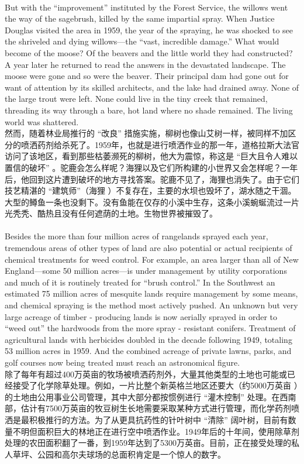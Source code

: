 \documentclass{article}
\begin{document}
\\
But with the “improvement” instituted by the Forest Service, the willows went the way of the sagebrush, killed by the same impartial spray. When Justice Douglas visited the area in 1959, the year of the spraying, he was shocked to see the shriveled and dying willows—the “vast, incredible damage.” What would become of the moose? Of the beavers and the little world they had constructed? A year later he returned to read the answers in the devastated landscape. The moose were gone and so were the beaver. Their principal dam had gone out for want of attention by its skilled architects, and the lake had drained away. None of the large trout were left. None could live in the tiny creek that remained, threading its way through a bare, hot land where no shade remained. The living world was shattered.\\
然而，随着林业局推行的 “改良” 措施实施，柳树也像山艾树一样，被同样不加区分的喷洒药剂给杀死了。1959年，也就是进行喷洒作业的那一年，道格拉斯大法官访问了该地区，看到那些枯萎濒死的柳树，他大为震惊，称这是 “巨大且令人难以置信的破坏” 。驼鹿会怎么样呢？海狸以及它们所构建的小世界又会怎样呢？一年后，他回到这片遭到破坏的地方寻找答案。驼鹿不见了，海狸也消失了。由于它们技艺精湛的 “建筑师”（海狸 ）不复存在，主要的水坝也毁坏了，湖水随之干涸。大型的鳟鱼一条也没剩下。没有鱼能在仅存的小溪中生存，这条小溪蜿蜒流过一片光秃秃、酷热且没有任何遮荫的土地。生物世界被摧毁了。\\

\\
Besides the more than four million acres of rangelands sprayed each year, tremendous areas of other types of land are also potential or actual recipients of chemical treatments for weed control. For example, an area larger than all of New England—some 50 million acres—is under management by utility corporations and much of it is routinely treated for “brush control.” In the Southwest an estimated 75 million acres of mesquite lands require management by some means, and chemical spraying is the method most actively pushed. An unknown but very large acreage of timber - producing lands is now aerially sprayed in order to “weed out” the hardwoods from the more spray - resistant conifers. Treatment of agricultural lands with herbicides doubled in the decade following 1949, totaling 53 million acres in 1959. And the combined acreage of private lawns, parks, and golf courses now being treated must reach an astronomical figure.\\
除了每年有超过400万英亩的牧场被喷洒药剂外，大量其他类型的土地也可能或已经接受了化学除草处理。例如，一片比整个新英格兰地区还要大（约5000万英亩 ）的土地由公用事业公司管理，其中大部分都按惯例进行 “灌木控制” 处理。在西南部，估计有7500万英亩的牧豆树生长地需要采取某种方式进行管理，而化学药剂喷洒是最积极推行的方法。为了从更具抗药性的针叶树中 “清除” 阔叶树，目前有数量不明但面积巨大的林地正在进行空中喷洒作业。1949年后的十年间，使用除草剂处理的农田面积翻了一番，到1959年达到了5300万英亩。目前，正在接受处理的私人草坪、公园和高尔夫球场的总面积肯定是一个惊人的数字。 \\
\end{document}

